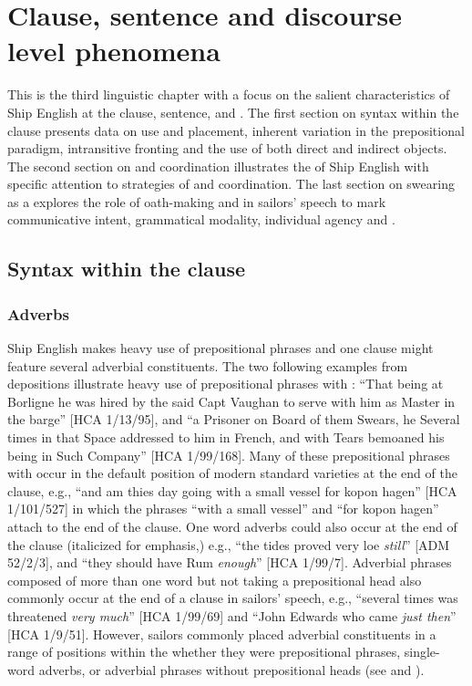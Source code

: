 \chapter{{Clause, sentence and discourse level phenomena}}

This is the third linguistic chapter with a focus on the salient characteristics of Ship English at the clause, sentence, and . The first section on syntax within the clause presents data on  use and placement, inherent variation in the prepositional paradigm, intransitive  fronting and the use of both direct and indirect objects. The second section on  and coordination illustrates the  of Ship English with specific attention to strategies of  and coordination. The last section on swearing as a  explores the role of oath-making and  in sailors’ speech to mark communicative intent, grammatical modality, individual agency and . 

\section{{Syntax within the clause}}%

\subsection{{Adverbs}}%

Ship English makes heavy use of prepositional phrases and one clause might feature several adverbial constituents. The two following examples from depositions illustrate heavy use of prepositional phrases with : “That being at Borligne he was hired by the said Capt Vaughan to serve with him as Master in the barge” [HCA 1/13/95], and “a Prisoner on Board of them Swears, he Several times in that Space addressed to him in French, and with Tears bemoaned his being in Such Company” [HCA 1/99/168]. Many of these prepositional phrases with  occur in the default position of modern standard varieties at the end of the clause, e.g., “and am thies day going with a small vessel for kopon hagen” [HCA 1/101/527] in which the phrases “with a small vessel” and “for kopon hagen” attach to the end of the clause. One word adverbs could also occur at the end of the clause (italicized for emphasis,) e.g., “the tides proved very loe \textit{still}” [ADM 52/2/3], and “they should have Rum \textit{enough}” [HCA 1/99/7]. Adverbial phrases composed of more than one word but not taking a prepositional head also commonly occur at the end of a clause in sailors’ speech, e.g., “several times was threatened \textit{very much}” [HCA 1/99/69] and “John Edwards who came \textit{just then}” [HCA 1/9/51]. However, sailors commonly placed adverbial constituents in a range of positions within the  whether they were prepositional phrases, single-word adverbs, or adverbial phrases without prepositional heads (see  and ). 

